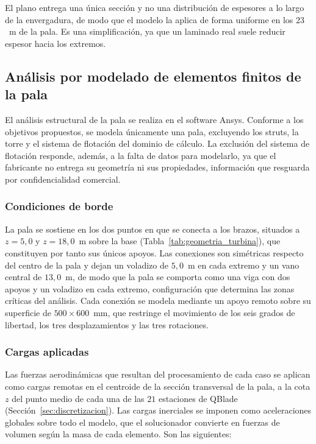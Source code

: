 El plano entrega una única sección y no una distribución de espesores a lo largo de la envergadura, de modo que el modelo la aplica de forma uniforme en los $23$~m de la pala. Es una simplificación, ya que un laminado real suele reducir espesor hacia los extremos.

\subsection{Análisis por modelado de elementos finitos de la pala}
\label{sec:fem}

El análisis estructural de la pala se realiza en el software Ansys. Conforme a los objetivos propuestos, se modela únicamente una pala, excluyendo los struts, la torre y el sistema de flotación del dominio de cálculo. La exclusión del sistema de flotación responde, además, a la falta de datos para modelarlo, ya que el fabricante no entrega su geometría ni sus propiedades, información que resguarda por confidencialidad comercial.

\subsubsection{Condiciones de borde}
\label{sec:condiciones_borde}

La pala se sostiene en los dos puntos en que se conecta a los brazos, situados a $z = 5{,}0$ y $z = 18{,}0$~m sobre la base (Tabla~\ref{tab:geometria_turbina}), que constituyen por tanto sus únicos apoyos. Las conexiones son simétricas respecto del centro de la pala y dejan un voladizo de $5{,}0$~m en cada extremo y un vano central de $13{,}0$~m, de modo que la pala se comporta como una viga con dos apoyos y un voladizo en cada extremo, configuración que determina las zonas críticas del análisis. Cada conexión se modela mediante un apoyo remoto sobre su superficie de $500 \times 600$~mm, que restringe el movimiento de los seis grados de libertad, los tres desplazamientos y las tres rotaciones.

\subsubsection{Cargas aplicadas}

Las fuerzas aerodinámicas que resultan del procesamiento de cada caso se aplican como cargas remotas en el centroide de la sección transversal de la pala, a la cota $z$ del punto medio de cada una de las $21$ estaciones de QBlade (Sección~\ref{sec:discretizacion}). Las cargas inerciales se imponen como aceleraciones globales sobre todo el modelo, que el solucionador convierte en fuerzas de volumen según la masa de cada elemento. Son las siguientes:

